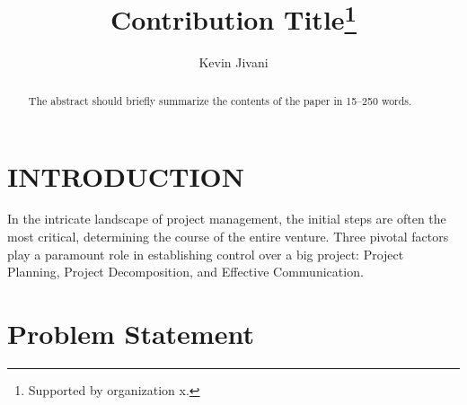 \documentclass[runningheads]{llncs}
\begin{document}
%
\title{Contribution Title\thanks{Supported by organization x.}}
%
%
\author{Kevin Jivani}
%
%

\maketitle              %
%
\begin{abstract}
The abstract should briefly summarize the contents of the paper in
15--250 words.

\end{abstract}
%
%
%

\tableofcontents

\section{INTRODUCTION}

In the intricate landscape of project management, the initial steps are often the most critical, determining the course of the entire venture. Three pivotal factors play a paramount role in establishing control over a big project: Project Planning, Project Decomposition, and Effective Communication.

\section{Problem Statement}
\end{document}
